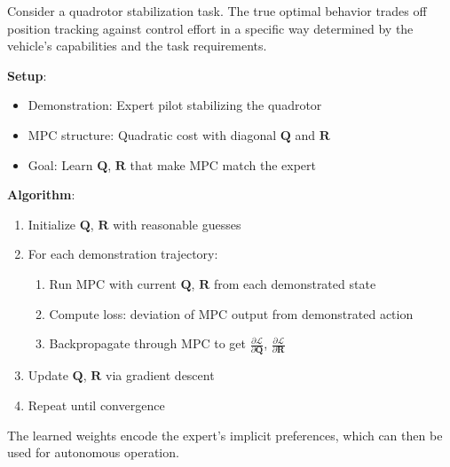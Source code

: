 \begin{example}
\label{ex:learn_cost_weights}
Consider a quadrotor stabilization task. The true optimal behavior trades off position tracking against control effort in a specific way determined by the vehicle's capabilities and the task requirements.

\textbf{Setup}:
\begin{itemize}
    \item Demonstration: Expert pilot stabilizing the quadrotor
    \item MPC structure: Quadratic cost with diagonal $\mathbf{Q}$ and $\mathbf{R}$
    \item Goal: Learn $\mathbf{Q}$, $\mathbf{R}$ that make MPC match the expert
\end{itemize}

\textbf{Algorithm}:
\begin{enumerate}
    \item Initialize $\mathbf{Q}$, $\mathbf{R}$ with reasonable guesses
    \item For each demonstration trajectory:
    \begin{enumerate}
        \item Run MPC with current $\mathbf{Q}$, $\mathbf{R}$ from each demonstrated state
        \item Compute loss: deviation of MPC output from demonstrated action
        \item Backpropagate through MPC to get $\frac{\partial \mathcal{L}}{\partial \mathbf{Q}}$, $\frac{\partial \mathcal{L}}{\partial \mathbf{R}}$
    \end{enumerate}
    \item Update $\mathbf{Q}$, $\mathbf{R}$ via gradient descent
    \item Repeat until convergence
\end{enumerate}

The learned weights encode the expert's implicit preferences, which can then be used for autonomous operation.
\end{example}


